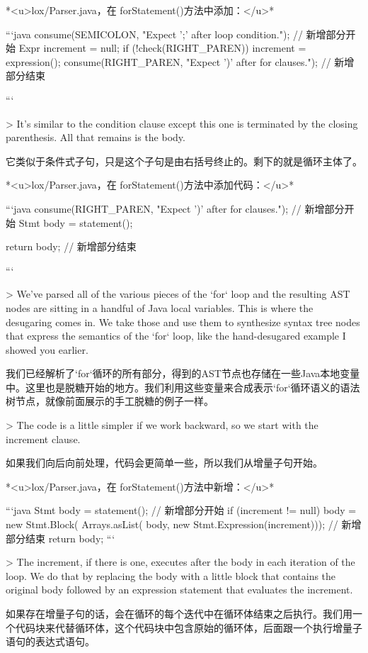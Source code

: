 \documentclass[cn,11pt,chinese]{elegantbook}
\begin{document}
{{*<u>lox/Parser.java，在 forStatement()方法中添加：</u>*

```java
    consume(SEMICOLON, "Expect ';' after loop condition.");
    // 新增部分开始
    Expr increment = null;
    if (!check(RIGHT_PAREN)) {
      increment = expression();
    }
    consume(RIGHT_PAREN, "Expect ')' after for clauses.");
    // 新增部分结束
  }
```

> It’s similar to the condition clause except this one is terminated by the closing parenthesis. All that remains is the body.

它类似于条件式子句，只是这个子句是由右括号终止的。剩下的就是循环主体了。

*<u>lox/Parser.java，在 forStatement()方法中添加代码：</u>*

```java
    consume(RIGHT_PAREN, "Expect ')' after for clauses.");
    // 新增部分开始
    Stmt body = statement();

    return body;
    // 新增部分结束
  }
```

> We’ve parsed all of the various pieces of the `for` loop and the resulting AST nodes are sitting in a handful of Java local variables. This is where the desugaring comes in. We take those and use them to synthesize syntax tree nodes that express the semantics of the `for` loop, like the hand-desugared example I showed you earlier.

我们已经解析了`for`循环的所有部分，得到的AST节点也存储在一些Java本地变量中。这里也是脱糖开始的地方。我们利用这些变量来合成表示`for`循环语义的语法树节点，就像前面展示的手工脱糖的例子一样。

> The code is a little simpler if we work backward, so we start with the increment clause.

如果我们向后向前处理，代码会更简单一些，所以我们从增量子句开始。

*<u>lox/Parser.java，在 forStatement()方法中新增：</u>*

```java
    Stmt body = statement();
    // 新增部分开始
    if (increment != null) {
      body = new Stmt.Block(
          Arrays.asList(
              body,
              new Stmt.Expression(increment)));
    }
    // 新增部分结束
    return body;
```

> The increment, if there is one, executes after the body in each iteration of the loop. We do that by replacing the body with a little block that contains the original body followed by an expression statement that evaluates the increment.

如果存在增量子句的话，会在循环的每个迭代中在循环体结束之后执行。我们用一个代码块来代替循环体，这个代码块中包含原始的循环体，后面跟一个执行增量子语句的表达式语句。
\end{document}
